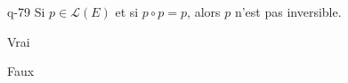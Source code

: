 \begin{truefalse}{q-79}
Si $p\in \mathcal{L}(E)$ et si $p \circ p = p$, alors $p$ n'est pas inversible.
\item Vrai
\item* Faux
\end{truefalse}

